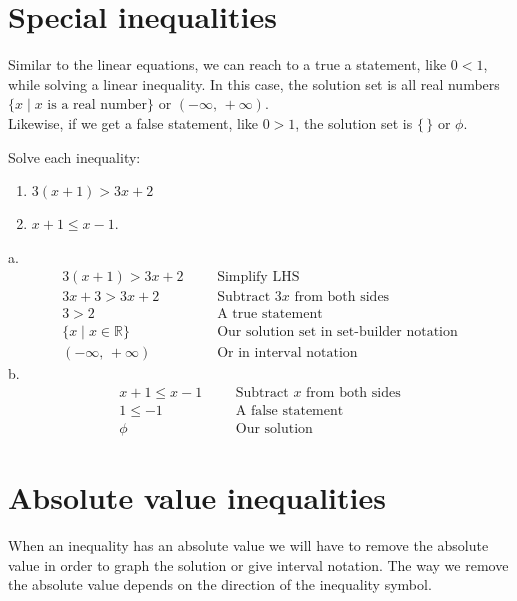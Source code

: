 \section{Special inequalities}
Similar to the linear equations, we can reach to a true a statement, like $0<1$, while solving a linear inequality. In this case, the solution set is all real numbers $\{x \mid x\text{ is a real number}\}$ or $(-\infty,\,+\infty)$.\\
Likewise, if we get a false statement, like $0>1$, the solution set is $\{\,\}$ or $\phi$.
\begin{exa}
    Solve each inequality:
    \begin{enumerate}[\bfseries a.]
        \item $3(x+1) > 3x+2$
        \item $x+1 \le x-1$.
    \end{enumerate}
\end{exa}
a.
\begin{align*}
    3(x+1) > 3x+2&  &   &\text{Simplify LHS}\\
    3x+3 > 3x+2&    &   &\text{Subtract $3x$ from both sides}\\
    3>2&    &   &\text{A true statement}\\
    \{x \mid x \in \mathbb{R}\}& &   &\text{Our solution set in set-builder notation}\\
    (-\infty,\,+\infty)&    &   &\text{Or in interval notation}
\end{align*}
b.
\begin{align*}
    x+1 \le x-1&    &   &\text{Subtract $x$ from both sides}\\
    1 \le -1&   &   &\text{A false statement}\\
    \phi& &   &\text{Our solution}
\end{align*}
\section{Absolute value inequalities}
When an inequality has an absolute value we will have to remove the absolute value in order to graph the solution or give interval notation. The way we remove the absolute value depends on the direction of the inequality symbol.

